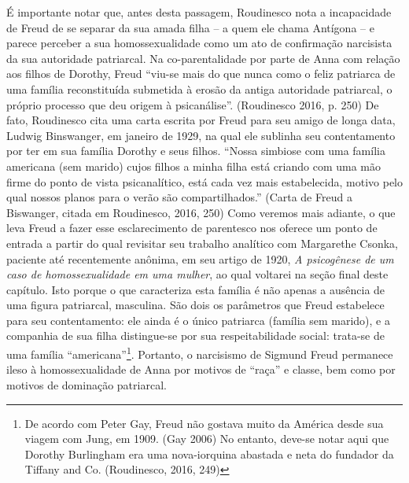É importante notar que, antes desta passagem, Roudinesco nota a
incapacidade de Freud de se separar da sua amada filha -- a quem ele
chama Antígona -- e parece perceber a sua homossexualidade como um ato
de confirmação narcisista da sua autoridade patriarcal. Na
co-parentalidade por parte de Anna com relação aos filhos de Dorothy,
Freud ``viu-se mais do que nunca como o feliz patriarca de uma família
reconstituída submetida à erosão da antiga autoridade patriarcal, o
próprio processo que deu origem à psicanálise''. (Roudinesco 2016, p.
250) De fato, Roudinesco cita uma carta escrita por Freud para seu amigo
de longa data, Ludwig Binswanger, em janeiro de 1929, na qual ele
sublinha seu contentamento por ter em sua família Dorothy e seus filhos.
``Nossa simbiose com uma família americana (sem marido) cujos filhos a
minha filha está criando com uma mão firme do ponto de vista
psicanalítico, está cada vez mais estabelecida, motivo pelo qual nossos
planos para o verão são compartilhados.'' (Carta de Freud a Biswanger,
citada em Roudinesco, 2016, 250) Como veremos mais adiante, o que leva
Freud a fazer esse esclarecimento de parentesco nos oferece um ponto de
entrada a partir do qual revisitar seu trabalho analítico com Margarethe
Csonka, paciente até recentemente anônima, em seu artigo de 1920,
\emph{A psicogênese de um caso de homossexualidade em uma mulher}, ao
qual voltarei na seção final deste capítulo. Isto porque o que
caracteriza esta família é não apenas a ausência de uma figura
patriarcal, masculina. São dois os parâmetros que Freud estabelece para
seu contentamento: ele ainda é o único patriarca (família sem marido), e
a companhia de sua filha distingue-se por sua respeitabilidade social:
trata-se de uma família ``americana''\footnote{De acordo com Peter Gay,
  Freud não gostava muito da América desde sua viagem com Jung, em 1909.
  (Gay 2006) No entanto, deve-se notar aqui que Dorothy Burlingham era
  uma nova-iorquina abastada e neta do fundador da Tiffany and Co.
  (Roudinesco, 2016, 249)}. Portanto, o narcisismo de Sigmund Freud
permanece ileso à homossexualidade de Anna por motivos de ``raça'' e
classe, bem como por motivos de dominação patriarcal.

